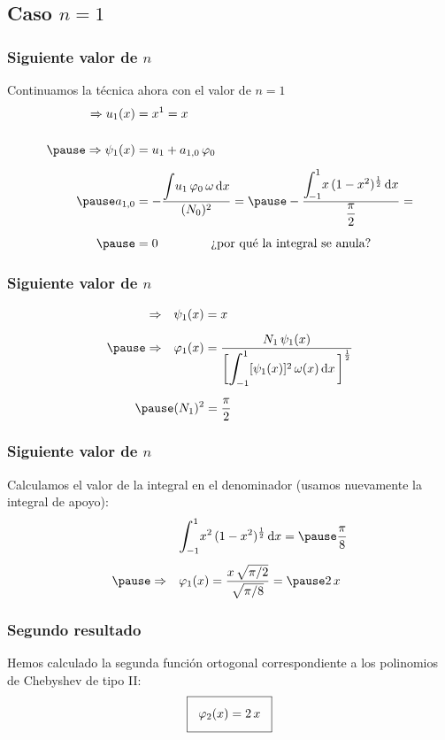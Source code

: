 \documentclass[12pt]{beamer}
\begin{document}
\subsection{Caso \texorpdfstring{$n=1$}{n=1}}

\begin{frame}
\frametitle{Siguiente valor de $n$}
Continuamos la técnica ahora con el valor de $n = 1$
\pause
\begin{eqnarray*}
\begin{aligned}
\Rightarrow u_{1} (x) &= x^{1} = x \\[0.5cm] \pause
\Rightarrow \psi_{1} (x) &=  u_{1} + a_{1,0} \, \varphi_{0} \\[0.5em] \pause
a_{1,0} &= - \dfrac{\scaleint{5ex} u_{1} \, \varphi_{0} \, \omega \dd{x}}{(N_{0})^{2}} = \pause
- \dfrac{\scaleint{5ex}_{\bs -1}^{1} x \, (1 - x^{2})^{\frac{1}{2}} \dd{x}}{\dfrac{\pi}{2}} = \\[0.5em] \pause
&= 0 \hspace{1.5cm} \text{¿por qué la integral se anula?}
\end{aligned}
\end{eqnarray*}    
\end{frame}
\begin{frame}
\frametitle{Siguiente valor de $n$}
\begin{eqnarray*}
\begin{aligned}
\Rightarrow \quad &\psi_{1} (x) =  x \\[0.5em] \pause
\Rightarrow \quad &\varphi_{1} (x) = \dfrac{N_{1} \, \psi_{1} (x)}{\bigg[ \scaleint{6ex}_{\bs -1}^{1} [\psi_{1} (x)]^{2} \, \omega (x) \dd{x} \bigg]^{\frac{1}{2}}} \\[0.5em] \pause
&(N_{1})^{2} = \dfrac{\pi}{2}
\end{aligned}
\end{eqnarray*}    
\end{frame}
\begin{frame}
\frametitle{Siguiente valor de $n$}
Calculamos el valor de la integral en el denominador (usamos nuevamente la integral de apoyo):
\pause
\begin{eqnarray*}
\begin{aligned}
&\scaleint{6ex}_{\bs -1}^{1} x^{2} \, (1 - x^{2})^{\frac{1}{2}} \dd{x} = \pause \dfrac{\pi}{8} \\[0.4em] \pause
\Rightarrow \quad &\varphi_{1} (x) = \dfrac{x \, \sqrt{\pi/2}}{\sqrt{\pi/8}} = \pause 2 \, x
\end{aligned}
\end{eqnarray*}    
\end{frame}
\begin{frame}
\frametitle{Segundo resultado}
Hemos calculado la segunda función ortogonal correspondiente a los polinomios de Chebyshev de tipo II:
\pause
\begin{align*}
\setlength{\fboxsep}{3\fboxsep}\boxed{
\varphi_{2} (x) = 2 \, x}
\end{align*}
\end{frame}
\end{document}
